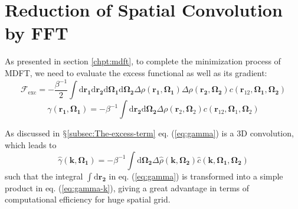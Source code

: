 
\chapter{Reduction of Spatial Convolution by FFT\label{chpt:fft-spatial}}

As presented in section \ref{chpt:mdft}, to complete the minimization
process of \acs{MDFT}, we need to evaluate the excess functional
as well as its gradient:
\begin{equation}
\mathcal{F}_{\mathrm{exc}}=-\frac{\beta^{-1}}{2}\int\mathrm{d}\mathbf{r_{1}}\mathrm{d}\mathbf{r_{2}}\mathrm{d}\mathbf{\Omega_{1}}\mathrm{d}\mathbf{\Omega_{2}}\Delta\rho(\mathbf{r_{1}},\mathbf{\Omega_{1}})\Delta\rho(\mathbf{r_{2}},\mathbf{\Omega_{2}})c(\mathbf{r}_{12},\mathbf{\Omega_{1}},\mathbf{\Omega_{2}})\label{eq:fexc}
\end{equation}
\begin{equation}
\gamma(\mathbf{r_{1}},\mathbf{\Omega_{1}})=-\beta^{-1}\int\mathrm{d}\mathbf{r_{2}}\mathrm{d}\mathbf{\Omega_{2}}\Delta\rho(\mathbf{r}_{2},\mathbf{\Omega}_{2})c(\mathbf{r}_{12},\mathbf{\Omega}_{1},\mathbf{\Omega}_{2})\label{eq:gamma}
\end{equation}

As discussed in $\mathsection$\ref{subsec:The-excess-term} eq. (\ref{eq:gamma})
is a 3D convolution, which leads to
\begin{equation}
\hat{\gamma}(\mathbf{k},\mathbf{\Omega_{1}})=-\beta^{-1}\int\mathrm{d}\mathbf{\Omega_{2}}\Delta\hat{\rho}(\mathbf{k},\mathbf{\Omega_{2}})\hat{c}(\mathbf{k},\mathbf{\Omega_{1}},\mathbf{\Omega_{2}})\label{eq:gamma-k}
\end{equation}
such that the integral $\int\mathrm{d}\mathbf{r_{2}}$ in eq. (\ref{eq:gamma})
is transformed into a simple product in eq. (\ref{eq:gamma-k}), giving
a great advantage in terms of computational efficiency for huge spatial
grid. 

